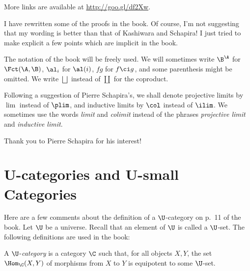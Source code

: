 \documentclass[12pt]{article}
\theoremstyle{remark}
\theoremstyle{definition}
\begin{document}



More links are available at \href{http://goo.gl/df2Xw}{http://goo.gl/df2Xw}. 

I have rewritten some of the proofs in the book. Of course, I'm not suggesting that my wording is better than that of Kashiwara and Schapira! I just tried to make explicit a few points which are implicit in the book. 


The notation of the book will be freely used. We will sometimes write $\B^\A$ for $\Fct(\A,\B)$, $\al_i$ for $\al(i)$, $fg$ for $f\ci g$, and some parenthesis might be omitted. We write $\bigsqcup$\index{$\bigsqcup$} instead of $\coprod$\index{$\coprod$} for the coproduct. 

Following a suggestion of Pierre Schapira's, we shall denote projective limits by $\lim$\index{$\lim$} instead of $\plim$\index{$\plim$}, and inductive limits by $\col$\index{$\col$} instead of $\ilim$\index{$\ilim$}. We sometimes use the words \emph{limit} and \emph{colimit} instead of the phrases \emph{projective limit} and \emph{inductive limit}.

Thank you to Pierre Schapira for his interest!


\section{U-categories and U-small Categories}

Here are a few comments about the definition of a $\U$-category on p.~11 of the book. Let $\U$ be a universe. Recall that an element of $\U$ is called a $\U$-set. The following definitions are used in the book: 

\begin{df}[$\U$-category] 
A $\U$-{\em category} is a category $\C$ such that, for all objects $X,Y$, the set $\Hom_\C(X,Y)$ of morphisms from $X$ to $Y$ is equipotent to some $\U$-set. 
\end{df} 
\end{document}
